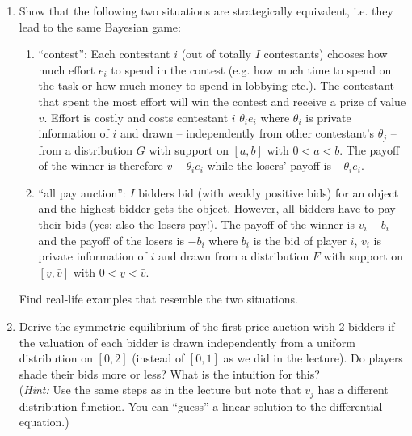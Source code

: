 \documentclass[a4paper,12pt]{article}
\begin{document}
\begin{enumerate}[resume]
\item\label{ex:stratEq} Show that the following two situations are strategically equivalent, i.e. they lead to the same Bayesian game:
  \begin{enumerate}
  \item ``contest'': Each contestant $i$ (out of totally $I$ contestants) chooses how much effort $e_i$ to spend in the contest (e.g. how much time to spend on the task or how much money to spend in lobbying etc.). The contestant that spent the most effort will win the contest and receive a prize of value $v$. Effort is costly and costs contestant $i$ $\theta _ie_i$ where $\theta _i$ is private information of $i$ and drawn -- independently from other contestant's $\theta _j$ -- from a distribution $G$ with support on $[a,b]$ with $0<a<b$. The payoff of the winner is therefore $v-\theta _ie_i$ while the losers' payoff is $-\theta _ie_i$.
  \item ``all pay auction'': $I$ bidders bid (with weakly positive bids) for an object and the highest bidder gets the object. However, all bidders have to pay their bids (yes: also the losers pay!). The payoff of the winner is $v_i -b_i$ and the payoff of the losers is $-b_i$ where $b_i$ is the bid of player $i$, $v_i$ is private information of $i$ and drawn from a distribution $F$ with support on $[\underline{v},\bar{v}]$ with $0<\underline{v}<\bar{v}$.
  \end{enumerate}
  Find real-life examples that resemble the two situations.
\item Derive the symmetric equilibrium of the first price auction with 2 bidders if the valuation of each bidder is drawn independently from a uniform distribution on $[0,2]$ (instead of $[0,1]$ as we did in the lecture). Do players shade their bids more or less? What is the intuition for this?\\
  (\emph{Hint:} Use the same steps as in the lecture but note that $v_j$ has a different distribution function. You can ``guess'' a linear solution to the differential equation.)

\end{enumerate}
\end{document}
